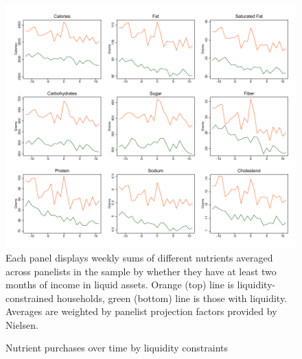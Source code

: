 \documentclass[12pt]{article}
\begin{document}
\clearpage
\begin{figure}[t]
\begin{center}
\caption{Nutrient purchases over time by liquidity constraints}
\label{graph_raw_nutrients}
\includegraphics[width=1\textwidth, angle=0]{../figures/raw_nutrients_week.pdf}
\footnotesize Each panel displays weekly sums of different nutrients averaged across panelists in the sample by whether they have at least two months of income in liquid assets.
Orange (top) line is liquidity-constrained households, green (bottom) line is those with liquidity.
Averages are weighted by panelist projection factors provided by Nielsen.
\end{center}
\end{figure}
\end{document}
